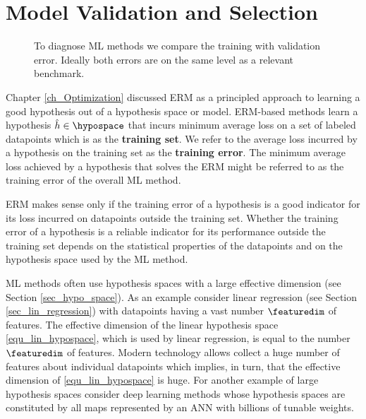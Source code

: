 \documentclass[12pt]{report}
\begin{document}
\newpage
\chapter{Model Validation and Selection} 
\label{ch_validation_selection}

\begin{figure}[htbp]
\begin{center}
\end{center}
\caption{To diagnose ML methods we compare the training with validation error. 
	Ideally both errors are on the same level as a relevant benchmark.}
 \label{fig_bars_val_sel}
\end{figure}



Chapter \ref{ch_Optimization} discussed ERM as a principled approach to learning a 
good hypothesis out of a hypothesis space or model. ERM-based methods learn a 
hypothesis $\hat{h} \in \hypospace$ that incurs minimum average loss on a set of 
labeled datapoints which is as the {\bf training set}. We refer to the average loss 
incurred by a hypothesis on the training set as the {\bf training error}. The minimum 
average loss achieved by a hypothesis that solves the ERM might be referred to as 
the training error of the overall ML method. 

ERM makes sense only if the training error of a hypothesis is a good indicator for 
its loss incurred on datapoints outside the training set. Whether the training 
error of a hypothesis is a reliable indicator for its performance outside the 
training set depends on the statistical properties of the datapoints and on the 
hypothesis space used by the ML method.  

ML methods often use hypothesis spaces with a large effective dimension (see Section \ref{sec_hypo_space}). 
As an example consider linear regression (see Section \ref{sec_lin_regression}) with datapoints 
having a vast number $\featuredim$ of features. The effective dimension of the linear hypothesis 
space \eqref{equ_lin_hypospace}, which is used by linear regression, is equal to the number 
$\featuredim$ of features. Modern technology allows collect a huge number of features about 
individual datapoints which implies, in turn, that the effective dimension of \eqref{equ_lin_hypospace} 
is huge. For another example of large hypothesis spaces consider deep learning methods whose 
hypothesis spaces are constituted by all maps represented by an ANN with billions of 
tunable weights. 
\end{document}
